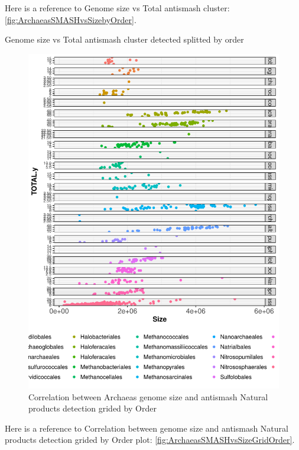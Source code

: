 \documentclass[12pt,twoside]{reedthesis}
\begin{document}
  Here is a reference to Genome size vs Total antismash cluster:
  \autoref{fig:ArchaeasSMASHvsSizebyOrder}. \clearpage
  
  Genome size vs Total antismash cluster detected splitted by order
  
  \begin{figure}[h!tbp]
  \centering
  \includegraphics[angle = 0,scale = 0.6]{chapter3/ArchaeasSMASHvsSizeGridOrder.pdf}
  \caption[Correlation between Archaeas genome size and antismash Natural products detection grided by Order]{\normalsize{Correlation between Archaeas genome size and antismash Natural products detection grided by Order}}
  \label{fig:ArchaeasSMASHvsSizeGridOrder}
  \end{figure}
  
  Here is a reference to Correlation between genome size and antismash
  Natural products detection grided by Order plot:
  \autoref{fig:ArchaeasSMASHvsSizeGridOrder}. \clearpage 
  
\end{document}
